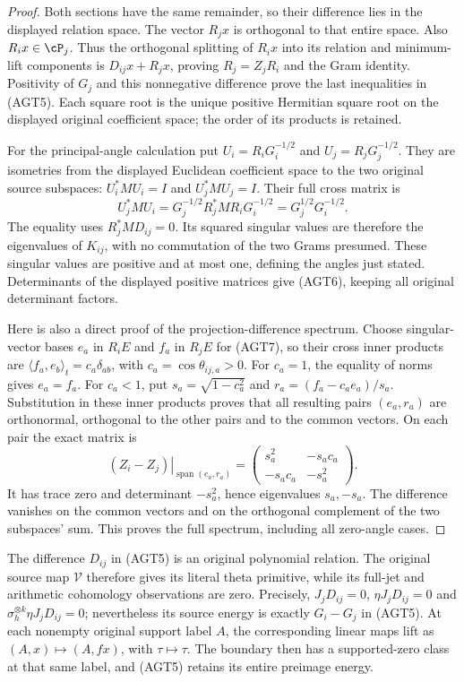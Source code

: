 \begin{proof}
Both sections have the same remainder, so their difference lies
in the displayed relation space. The vector $R_jx$ is orthogonal
to that entire space. Also $R_ix\in\cP_j$. Thus the orthogonal
splitting of $R_ix$ into its relation and minimum-lift components
is $D_{ij}x+R_jx$, proving $R_j=Z_jR_i$ and the Gram identity.
Positivity of $G_j$ and this nonnegative difference prove the
last inequalities in (AGT5). Each square root is the unique
positive Hermitian square root on the displayed original
coefficient space; the order of its products is retained.

For the principal-angle calculation put
$U_i=R_iG_i^{-1/2}$ and $U_j=R_jG_j^{-1/2}$.
They are isometries from the displayed Euclidean coefficient
space to the two original source subspaces: $U_i^*MU_i=I$
and $U_j^*MU_j=I$. Their full cross matrix is
\[
 U_j^*MU_i=G_j^{-1/2}R_j^*MR_iG_i^{-1/2}
          =G_j^{1/2}G_i^{-1/2}.
 \tag{AGT7}
\]
The equality uses $R_j^*MD_{ij}=0$. Its squared singular values
are therefore the eigenvalues of $K_{ij}$, with no commutation
of the two Grams presumed. These singular values are positive
and at most one, defining the angles just stated. Determinants
of the displayed positive matrices give (AGT6), keeping all
original determinant factors.

Here is also a direct proof of the projection-difference spectrum.
Choose singular-vector bases $e_a$ in $R_iE$ and $f_a$ in $R_jE$
for (AGT7), so their cross inner products are
$\langle f_a,e_b\rangle_t=c_a\delta_{ab}$, with
$c_a=\cos\theta_{ij,a}>0$. For $c_a=1$, the equality of norms
gives $e_a=f_a$. For $c_a<1$, put
$s_a=\sqrt{1-c_a^2}$ and $r_a=(f_a-c_ae_a)/s_a$.
Substitution in these inner products proves that all resulting
pairs $(e_a,r_a)$ are orthonormal, orthogonal to the other pairs
and to the common vectors. On each pair the exact matrix is
\[
 \left.(Z_i-Z_j)\right|_{\operatorname{span}(e_a,r_a)}
 =\begin{pmatrix}s_a^2&-s_ac_a\\-s_ac_a&-s_a^2\end{pmatrix}.
 \tag{AGT8}
\]
It has trace zero and determinant $-s_a^2$, hence eigenvalues
$s_a,-s_a$. The difference vanishes on the common vectors
and on the orthogonal complement of the two subspaces' sum.
This proves the full spectrum, including all zero-angle cases.
\end{proof}

The difference $D_{ij}$ in (AGT5) is an original polynomial
relation. The original source map $\mathcal V$ therefore gives
its literal theta primitive, while its full-jet and arithmetic
cohomology observations are zero. Precisely,
$J_jD_{ij}=0$, $\eta J_jD_{ij}=0$ and
$\sigma_h^{\otimes k}\eta J_jD_{ij}=0$; nevertheless its
source energy is exactly $G_i-G_j$ in (AGT5).
At each nonempty original support label $A$, the corresponding
linear maps lift as $(A,x)\mapsto(A,fx)$, with $\tau\mapsto\tau$.
The boundary then has a supported-zero class at that same
label, and (AGT5) retains its entire preimage energy.

